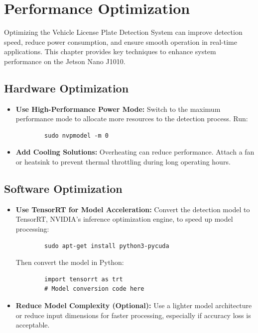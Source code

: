 %
%

\chapter{Performance Optimization}

Optimizing the Vehicle License Plate Detection System can improve detection speed, reduce power consumption, and ensure smooth operation in real-time applications. This chapter provides key techniques to enhance system performance on the Jetson Nano J1010.

\section{Hardware Optimization}
\begin{itemize}[label=--, left=1.5em]
	\item \textbf{Use High-Performance Power Mode:} Switch to the maximum performance mode to allocate more resources to the detection process. Run:
	\begin{verbatim}
		sudo nvpmodel -m 0
	\end{verbatim}
	\item \textbf{Add Cooling Solutions:} Overheating can reduce performance. Attach a fan or heatsink to prevent thermal throttling during long operating hours.
\end{itemize}

\section{Software Optimization}
\begin{itemize}[label=--, left=1.5em]
	\item \textbf{Use TensorRT for Model Acceleration:} Convert the detection model to TensorRT, NVIDIA's inference optimization engine, to speed up model processing:
	\begin{verbatim}
		sudo apt-get install python3-pycuda
	\end{verbatim}
	Then convert the model in Python:
	\begin{verbatim}
		import tensorrt as trt
		# Model conversion code here
	\end{verbatim}
	\item \textbf{Reduce Model Complexity (Optional):} Use a lighter model architecture or reduce input dimensions for faster processing, especially if accuracy loss is acceptable.
\end{itemize}

